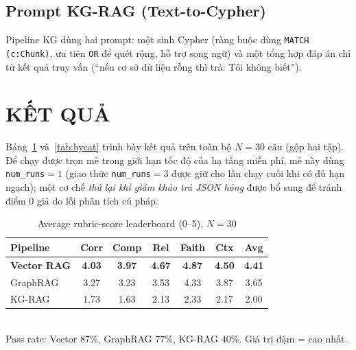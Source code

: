 \documentclass[conference]{IEEEtran}
\begin{document}
\subsection{Prompt KG-RAG (Text-to-Cypher)}
Pipeline KG dùng hai prompt: một sinh Cypher (ràng buộc dùng \texttt{MATCH (c:Chunk)}, ưu tiên \texttt{OR} để quét rộng, hỗ trợ song ngữ) và một tổng hợp đáp án chỉ từ kết quả truy vấn (``nếu cơ sở dữ liệu rỗng thì trả: Tôi không biết'').

\section{KẾT QUẢ}\label{sec:results}
Bảng~\ref{tab:rubric} và~\ref{tab:bycat} trình bày kết quả trên toàn bộ $N=30$ câu (gộp hai tập). Để chạy được trọn mẻ trong giới hạn tốc độ của hạ tầng miễn phí, mẻ này dùng \texttt{num\_runs}$=1$ (giao thức \texttt{num\_runs}$=3$ được giữ cho lần chạy cuối khi có đủ hạn ngạch); một cơ chế \emph{thử lại khi giám khảo trả JSON hỏng} được bổ sung để tránh điểm 0 giả do lỗi phân tích cú pháp.

\begin{table}[!t]
\caption{Average rubric-score leaderboard (0--5), $N=30$}
\label{tab:rubric}
\centering
\footnotesize
\setlength{\tabcolsep}{3pt}
\begin{tabular}{@{}l c c c c c c@{}}
\toprule
\textbf{Pipeline} & \textbf{Corr} & \textbf{Comp} & \textbf{Rel} & \textbf{Faith} & \textbf{Ctx} & \textbf{Avg} \\
\midrule
\textbf{Vector RAG} & \textbf{4.03} & \textbf{3.97} & \textbf{4.67} & \textbf{4.87} & \textbf{4.50} & \textbf{4.41} \\
GraphRAG & 3.27 & 3.23 & 3.53 & 4.33 & 3.87 & 3.65 \\
KG-RAG & 1.73 & 1.63 & 2.13 & 2.33 & 2.17 & 2.00 \\
\bottomrule
\end{tabular}
\\[2pt]
{\scriptsize Pass rate: Vector $87\%$, GraphRAG $77\%$, KG-RAG $40\%$. Giá trị đậm = cao nhất.}
\end{table}
\end{document}
